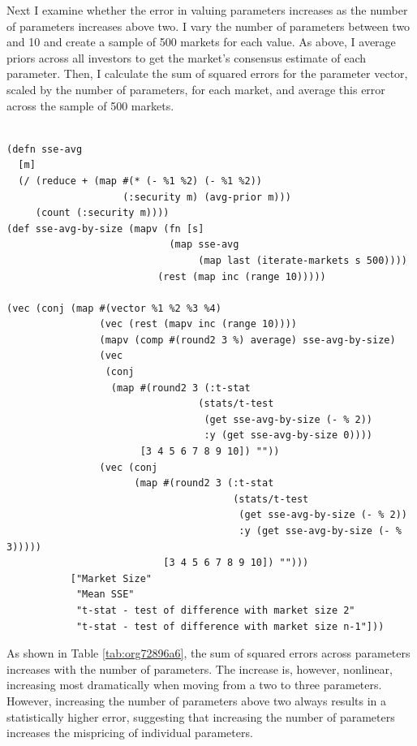 \documentclass[11pt]{article}
\begin{document}
Next I examine whether the error in valuing parameters increases as the number of parameters increases above two. I vary the number of parameters between two and 10 and create a sample of 500 markets for each value. As above, I average priors across all investors to get the market's consensus estimate of each parameter. Then, I calculate the sum of squared errors for the parameter vector, scaled by the number of parameters, for each market, and average this error across the sample of 500 markets.

\singlespacing
\lstset{language=Lisp,label=orga8790fc,caption= ,captionpos=b,numbers=none}
\begin{lstlisting}

(defn sse-avg
  [m]
  (/ (reduce + (map #(* (- %1 %2) (- %1 %2))
                    (:security m) (avg-prior m)))
     (count (:security m))))
(def sse-avg-by-size (mapv (fn [s]
                            (map sse-avg
                                 (map last (iterate-markets s 500))))
                          (rest (map inc (range 10)))))

(vec (conj (map #(vector %1 %2 %3 %4)
                (vec (rest (mapv inc (range 10))))
                (mapv (comp #(round2 3 %) average) sse-avg-by-size)
                (vec
                 (conj
                  (map #(round2 3 (:t-stat
                                 (stats/t-test
                                  (get sse-avg-by-size (- % 2))
                                  :y (get sse-avg-by-size 0)))) 
                       [3 4 5 6 7 8 9 10]) ""))
                (vec (conj
                      (map #(round2 3 (:t-stat
                                       (stats/t-test
                                        (get sse-avg-by-size (- % 2))
                                        :y (get sse-avg-by-size (- % 3))))) 
                           [3 4 5 6 7 8 9 10]) ""))) 
           ["Market Size"
            "Mean SSE"
            "t-stat - test of difference with market size 2"
            "t-stat - test of difference with market size n-1"]))

\end{lstlisting}
\doublespacing

As shown in Table \ref{tab:org72896a6}, the sum of squared errors across parameters increases with the number of parameters. The increase is, however, nonlinear, increasing most dramatically when moving from a two to three parameters. However, increasing the number of parameters above two always results in a statistically higher error, suggesting that increasing the number of parameters increases the mispricing of individual parameters.
\end{document}
